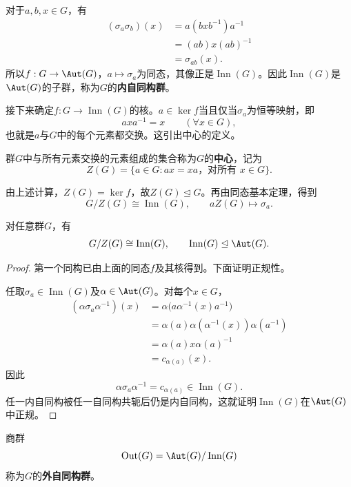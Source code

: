 对于$a,b,x\in G$，有
\begin{align*}
(\sigma_a \sigma_b)(x)&=a(bxb^{-1})a^{-1}\\
&=(ab)x(ab)^{-1}\\
&=\sigma_{ab}(x).
\end{align*}
\label{p2:concept:c2-l799}所以$f:G\to\Aut(G)$，$a\mapsto \sigma_a$为同态，其像正是$\operatorname{Inn}(G)$。因此$\operatorname{Inn}(G)$是$\Aut(G)$的子群，称为$G$的\textbf{内自同构群}。

接下来确定$f:G\to\operatorname{Inn}(G)$的核。$a\in\ker f$当且仅当$\sigma_a$为恒等映射，即
\[
axa^{-1}=x\qquad(\forall x\in G),
\]
也就是$a$与$G$中的每个元素都交换。这引出中心的定义。

\begin{definition}
\label{p2:concept:c2-l808}群$G$中与所有元素交换的元素组成的集合称为$G$的\textbf{中心}，记为
\[
Z(G)=\{a\in G:ax=xa\text{，对所有 }x\in G\}.
\]
\end{definition}

由上述计算，$Z(G)=\ker f$，故$Z(G)\trianglelefteq G$。再由同态基本定理，得到
\[
G/Z(G)\cong\operatorname{Inn}(G),\qquad aZ(G)\longmapsto \sigma_a.
\]

\begin{theorem}\label{p2:inner-aut}
对任意群$G$，有
\[
G/Z(G)\cong\operatorname{Inn}(G),\qquad
\operatorname{Inn}(G)\trianglelefteq\Aut(G).
\]
\end{theorem}
\begin{proof}
第一个同构已由上面的同态$f$及其核得到。下面证明正规性。

任取$\sigma_a\in\operatorname{Inn}(G)$及$\alpha\in\Aut(G)$。对每个$x\in G$，
\begin{align*}
(\alpha \sigma_a\alpha^{-1})(x)
&=\alpha\bigl(a\alpha^{-1}(x)a^{-1}\bigr)\\
&=\alpha(a)\alpha(\alpha^{-1}(x))\alpha(a^{-1})\\
&=\alpha(a)x\alpha(a)^{-1}\\
&=c_{\alpha(a)}(x).
\end{align*}
因此
\[
\alpha \sigma_a\alpha^{-1}=c_{\alpha(a)}\in\operatorname{Inn}(G).
\]
任一内自同构被任一自同构共轭后仍是内自同构，这就证明$\operatorname{Inn}(G)$在$\Aut(G)$中正规。
\end{proof}

\begin{definition}
\label{p2:concept:c2-l845}商群
\[
\operatorname{Out}(G)=\Aut(G)/\operatorname{Inn}(G)
\]
称为$G$的\textbf{外自同构群}。
\end{definition}

